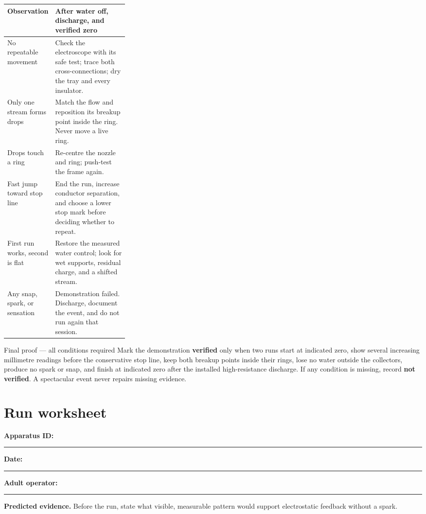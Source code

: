 \begin{tabularx}{\linewidth}{@{}p{0.29\linewidth}L@{}}
\toprule
\textbf{Observation} & \textbf{After water off, discharge, and verified zero}\\
\midrule
No repeatable movement & Check the electroscope with its safe test; trace both
cross-connections; dry the tray and every insulator.\\
Only one stream forms drops & Match the flow and reposition its breakup point
inside the ring. Never move a live ring.\\
Drops touch a ring & Re-centre the nozzle and ring; push-test the frame again.\\
Fast jump toward stop line & End the run, increase conductor separation, and
choose a lower stop mark before deciding whether to repeat.\\
First run works, second is flat & Restore the measured water control; look for
wet supports, residual charge, and a shifted stream.\\
Any snap, spark, or sensation & Demonstration failed. Discharge, document the
event, and do not run again that session.\\
\bottomrule
\end{tabularx}

\begin{telospanel}{Final proof --- all conditions required}
Mark the demonstration \textbf{verified} only when two runs start at indicated
zero, show several increasing millimetre readings before the conservative stop
line, keep both breakup points inside their rings, lose no water outside the
collectors, produce no spark or snap, and finish at indicated zero after the
installed high-resistance discharge. If any condition is missing, record
\textbf{not verified}. A spectacular event never repairs missing evidence.
\end{telospanel}

\clearpage
\section*{Run worksheet}
\noindent\textbf{Apparatus ID:}\ \rule{4.2cm}{.3pt}\hfill
\textbf{Date:}\ \rule{3.0cm}{.3pt}\hfill
\textbf{Adult operator:}\ \rule{4.0cm}{.3pt}

\medskip
\noindent\textbf{Predicted evidence.} Before the run, state what visible,
measurable pattern would support electrostatic feedback without a spark.

